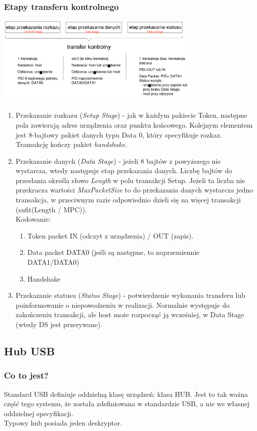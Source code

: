 	\subsubsection{Etapy transferu kontrolnego}
	\includegraphics[width=10cm]{./wyklady/USB_31_1.pdf}
	\begin{enumerate}
		\item Przekazanie rozkazu (\emph{Setup Stage}) - jak w każdym pakiecie Token, następne pola zawierają adres urządzenia oraz punktu końcowego. Kolejnym elementem jest 8-bajtowy pakiet danych typu Data 0, który specyfikuje rozkaz. Transakcję kończy pakiet \emph{handshake}.
		\item Przekazanie danych (\emph{Data Stage}) - jeżeli 8 bajtów z powyższego nie wystarcza, wtedy następuje etap przekazania danych. Liczbę bajtów do przesłania określa słowo \emph{Length} w polu transakcji Setup. Jeżeli ta liczba nie przekracza wartości \emph{MaxPacketSize} to do przekazania danych wystarcza jedno transakcja, w przeciwnym razie odpowiednio dzieli się na więcej transakcji (sufit(Length / MPC)).\\
		Kodowanie:
		\begin{enumerate}
			\item Token packet IN (odczyt z urządzenia) / OUT (zapis).
			\item Data packet DATA0 (jeśli są następne, to naprzemiennie DATA1/DATA0)
			\item Handshake
		\end{enumerate}
		\item Przekazanie statusu (\emph{Status Stage}) - potwierdzenie wykonania transferu lub poinformowanie o niepowodzeniu w realizacji. Normalnie występuje do zakończeniu transakcji, ale host może rozpocząć ją wcześniej, w Data Stage (wtedy DS jest przerywane).
	\end{enumerate}
	
\subsection{Hub USB}
	\subsubsection{Co to jest?}
	Standard USB definiuje oddzielną klasę urządzeń: klasa HUB. Jest to tak ważna część tego systemu, że została zdefiniowana w standardzie USB, a nie we własnej oddzielnej specyfikacji.\\
	Typowy hub posiada jeden deskryptor.
